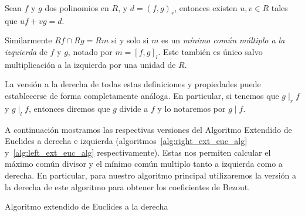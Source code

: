 \begin{proposition}
Sean \(f \text{ y } g\) dos polinomios en \(R\), y  \(d = {( f,g )_r}\), entonces existen \(u, v \in R\) tales que
\(
uf + vg = d
.\)
\end{proposition}
Similarmente  \(Rf \cap Rg = Rm\) si y solo si \(m\) es un \textit{mínimo común múltiplo a la izquierda} de \(f\) y \(g\), notado por \(m = {[f,g]}_l\). Este también es único salvo multiplicación a la izquierda por una unidad de \(R\).

La versión a la derecha de todas estas definiciones y propiedades puede establecerse de forma completamente análoga. En particular, si tenemos que \(g  \mid_r f\) y \(g  \mid_l f\), entonces diremos que \(g\) divide a \(f\) y lo notaremos por \(g  \mid f\).

A continuación mostramos las respectivas versiones del Algoritmo Extendido de Euclides a derecha e izquierda (algoritmos~\ref{alg:right_ext_euc_alg} y~\ref{alg:left_ext_euc_alg} respectivamente). Estas nos permiten calcular el máximo común divisor y el mínimo común multiplo tanto a izquierda como a derecha.
En particular, para nuestro algoritmo principal utilizaremos la versión a la derecha de este algoritmo para obtener los coeficientes de Bezout.

\begin{algorithm}[ht]\label{alg:right_ext_euc_alg}
 \caption{Algoritmo extendido de Euclides a la derecha}
\end{algorithm}

